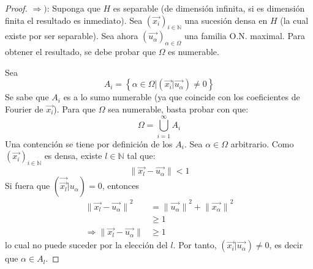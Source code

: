 \documentclass[12pt]{report}
\theoremstyle{largebreak}
\newcommand\norm[1]{\ensuremath{\|#1\|}}
\newcommand\pint[2]{\ensuremath{\left(#1\big| #2\right)}}
\begin{document}
    \begin{proof}
        $\Rightarrow)$: Suponga que $H$ es separable (de dimensión infinita, si es dimensión finita el resultado es inmediato). Sea $\left(\vec{x_i} \right)_{i\in\mathbb{N}}$ una sucesión densa en $H$ (la cual existe por ser separable). Sea ahora $\left(\vec{u_\alpha} \right)_{\alpha\in\Omega}$ una familia O.N. maximal. Para obtener el resultado, se debe probar que $\Omega$ es numerable.

        Sea
        \begin{equation*}
            A_i=\left\{\alpha\in\Omega\Big|\pint{\vec{x_i}}{\vec{u_\alpha}}\neq0 \right\}
        \end{equation*}
        Se sabe que $A_i$ es a lo sumo numerable (ya que coincide con los coeficientes de Fourier de $\vec{x_i}$). Para que $\Omega$ sea numerable, basta probar con que:
        \begin{equation*}
            \Omega=\bigcup_{ i=1}^\infty A_i
        \end{equation*}
        Una contención se tiene por definición de los $A_i$. Sea $\alpha\in\Omega$ arbitrario. Como $\left(\vec{x_i} \right)_{i\in\mathbb{N}}$ es densa, existe $l\in\mathbb{N}$ tal que:
        \begin{equation*}
            \norm{\vec{x_l}-\vec{u_\alpha}}<1
        \end{equation*}
        Si fuera que $\pint{\vec{\vec{x_l}}}{u_\alpha}=0$, entonces
        \begin{equation*}
            \begin{split}
                \norm{\vec{x_l}-\vec{u_\alpha}}^2&=\norm{\vec{u_\alpha}}^2+\norm{\vec{x_\alpha}}^2\\
                &\geq 1\\
                \Rightarrow \norm{\vec{x_l}-\vec{u_\alpha}}&\geq1
            \end{split}
        \end{equation*}
        lo cual no puede suceder por la elección del $l$. Por tanto, $\pint{\vec{x_i}}{\vec{u_\alpha}}\neq0$, es decir que $\alpha\in A_l$.


\end{proof}
\end{document}

